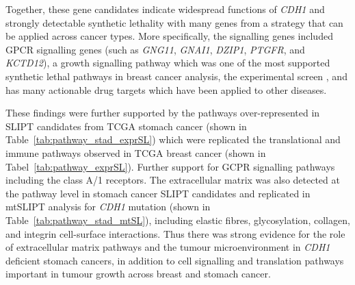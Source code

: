 Together, these gene candidates indicate widespread functions of \textit{CDH1} and strongly detectable synthetic lethality with many genes from a strategy that can be applied across cancer types. More specifically, the signalling genes included GPCR signalling genes (such as \textit{GNG11}, \textit{GNAI1}, \textit{DZIP1}, \textit{PTGFR}, and \textit{KCTD12}), a growth signalling pathway which was one of the most supported synthetic lethal pathways in breast cancer analysis, the experimental screen \citep{Telford2015}, and has many actionable drug targets which have been applied to other diseases.

These findings were further supported by the pathways over-represented in \gls{SLIPT} candidates from TCGA stomach cancer (shown in Table~\ref{tab:pathway_stad_exprSL}) which were replicated the translational and immune pathways observed in TCGA breast cancer (shown in Tabel~\ref{tab:pathway_exprSL}). Further support for GCPR signalling pathways including the class A/1 receptors. The extracellular matrix was also detected at the pathway level in stomach cancer \gls{SLIPT} candidates and replicated in mtSLIPT analysis for \textit{CDH1} mutation (shown in Table~\ref{tab:pathway_stad_mtSL}), including elastic fibres, glycosylation, collagen, and integrin cell-surface interactions. Thus there was strong evidence for the role of extracellular matrix pathways and the tumour microenvironment in \textit{CDH1} deficient stomach cancers, in addition to cell signalling and translation pathways important in tumour growth across breast and stomach cancer.


